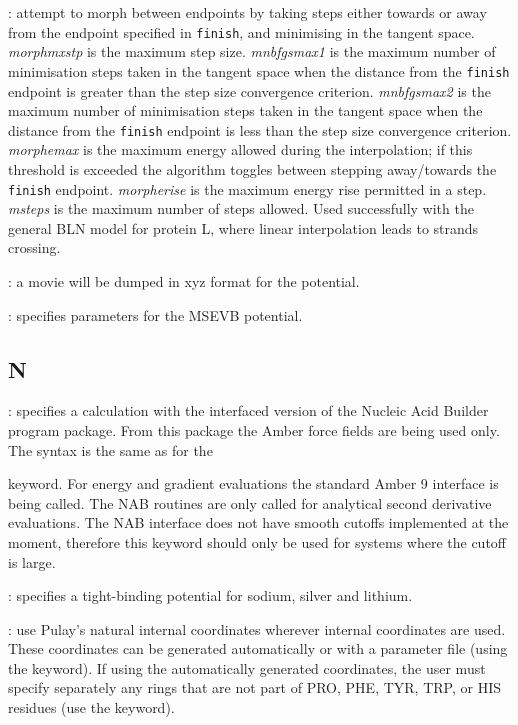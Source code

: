 {{:
attempt to morph between endpoints by taking steps either towards or away from the
endpoint specified in {\tt finish}, and minimising in the tangent space.
{\it morphmxstp\/} is the maximum step size.
{\it mnbfgsmax1\/} is the maximum number of minimisation steps taken in the tangent
space when the distance from the {\tt finish} endpoint is greater than the 
step size convergence criterion.
{\it mnbfgsmax2\/} is the maximum number of minimisation steps taken in the tangent
space when the distance from the {\tt finish} endpoint is less than the
step size convergence criterion.
{\it morphemax\/} is the maximum energy allowed during the interpolation; 
if this threshold is exceeded the algorithm toggles between stepping away/towards
the {\tt finish} endpoint.
{\it morpherise\/} is the maximum energy rise permitted in a step.
{\it msteps\/} is the maximum number of {} steps allowed.
Used successfully with the general BLN model for protein L, where linear
interpolation leads to strands crossing.

: a movie will be dumped in xyz format for the {} potential.

: 
specifies parameters for the MSEVB potential.

\subsection{N}
: specifies a calculation with the interfaced
version of the Nucleic Acid Builder program package. From this package the Amber force fields
are being used only. The syntax is the same as for the { keyword. For energy 
and gradient evaluations the standard Amber 9 interface is being called. The NAB routines 
are only called for analytical second derivative evaluations. The NAB interface does not 
have smooth cutoffs implemented at the moment, therefore this keyword should only be used 
for systems where the cutoff is large. 

: specifies a tight-binding potential for sodium, silver and lithium.

: use Pulay's natural internal coordinates\cite{PulayFPB79, FogarasiZTP92}
  wherever internal coordinates are used. These coordinates can be generated
  automatically or with a parameter file (using the {}
  keyword). If using the automatically generated coordinates, the user must
  specify separately any rings that are not part of PRO, PHE, TYR, TRP, or HIS
  residues (use the {} keyword).

}}}
